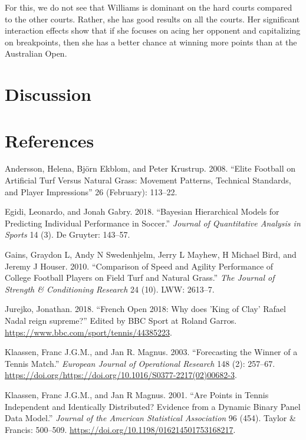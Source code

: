 \documentclass[]{article}
\begin{document}
For this, we do not see that Williams is dominant on the hard courts
compared to the other courts. Rather, she has good results on all the
courts. Her significant interaction effects show that if she focuses on
acing her opponent and capitalizing on breakpoints, then she has a
better chance at winning more points than at the Australian Open.

\hypertarget{sec:discussion}{%
\section{Discussion}\label{sec:discussion}}

\hypertarget{sec:refs}{%
\section{References}\label{sec:refs}}

\footnotesize

\hypertarget{refs}{}
\leavevmode\hypertarget{ref-andersson2008}{}%
Andersson, Helena, Björn Ekblom, and Peter Krustrup. 2008. ``Elite
Football on Artificial Turf Versus Natural Grass: Movement Patterns,
Technical Standards, and Player Impressions'' 26 (February): 113--22.

\leavevmode\hypertarget{ref-egidi2018}{}%
Egidi, Leonardo, and Jonah Gabry. 2018. ``Bayesian Hierarchical Models
for Predicting Individual Performance in Soccer.'' \emph{Journal of
Quantitative Analysis in Sports} 14 (3). De Gruyter: 143--57.

\leavevmode\hypertarget{ref-gains2010}{}%
Gains, Graydon L, Andy N Swedenhjelm, Jerry L Mayhew, H Michael Bird,
and Jeremy J Houser. 2010. ``Comparison of Speed and Agility Performance
of College Football Players on Field Turf and Natural Grass.'' \emph{The
Journal of Strength \& Conditioning Research} 24 (10). LWW: 2613--7.

\leavevmode\hypertarget{ref-bbc2018}{}%
Jurejko, Jonathan. 2018. ``French Open 2018: Why does 'King of Clay'
Rafael Nadal reign supreme?'' Edited by BBC Sport at Roland Garros.
\url{https://www.bbc.com/sport/tennis/44385223}.

\leavevmode\hypertarget{ref-klaassen2003}{}%
Klaassen, Franc J.G.M., and Jan R. Magnus. 2003. ``Forecasting the
Winner of a Tennis Match.'' \emph{European Journal of Operational
Research} 148 (2): 257--67.
\url{https://doi.org/https://doi.org/10.1016/S0377-2217(02)00682-3}.

\leavevmode\hypertarget{ref-klaassen2001}{}%
Klaassen, Franc J.G.M., and Jan R Magnus. 2001. ``Are Points in Tennis
Independent and Identically Distributed? Evidence from a Dynamic Binary
Panel Data Model.'' \emph{Journal of the American Statistical
Association} 96 (454). Taylor \& Francis: 500--509.
\url{https://doi.org/10.1198/016214501753168217}.
\end{document}
